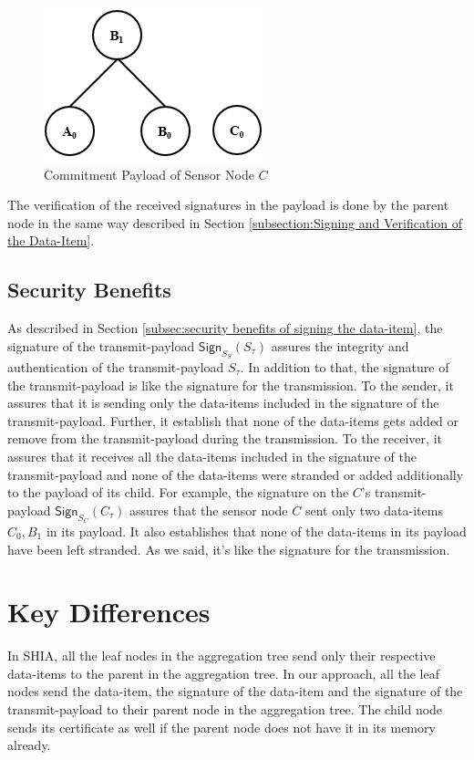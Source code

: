 	\begin{figure}[h!]
		\centering
		\includegraphics[scale = 1]{images/commitment-payload-of-C.png}
		\caption{Commitment Payload of Sensor Node $C$}
		\label{fig:Commitment payload of C}
	\end{figure}
	The verification of the received signatures in the payload is done by the parent node in the same way described in Section \ref{subsection:Signing and Verification of the Data-Item}.

	\subsection{Security Benefits}
		As described in Section \ref{subsec:security benefits of signing the data-item}, the signature of the transmit-payload $\textsf{Sign}_{S_{S}}(S_{\tau})$ assures the integrity and authentication of the transmit-payload $S_{\tau}$.
		In addition to that, the signature of the transmit-payload is like the signature for the transmission.
		To the sender, it assures that it is sending only the data-items included in the signature of the transmit-payload.
		Further, it establish that none of the data-items gets added or remove from the transmit-payload during the transmission. 
		To the receiver, it assures that it receives all the data-items included in the signature of the transmit-payload and none of the data-items were stranded or added additionally to the payload of its child.
		For example, the signature on the $C$'s transmit-payload $\textsf{Sign}_{S_{C}}(C_{\tau})$ assures that the sensor node $C$ sent only two data-items $C_{0},B_{1}$ in its payload.
		It also establishes that none of the data-items in its payload have been left stranded.
		As we said, it's like the signature for the transmission.

\section{Key Differences}

	In SHIA, all the leaf nodes in the aggregation tree send only their respective data-items to the parent in the aggregation tree.
	In our approach, all the leaf nodes send the data-item, the signature of the data-item and the signature of the transmit-payload to their parent node in the aggregation tree. 
	The child node sends its certificate as well if the parent node does not have it in its memory already.

